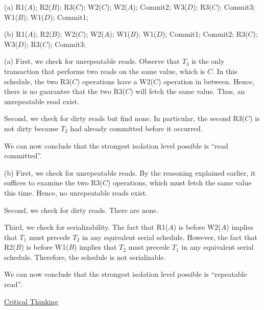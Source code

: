 \vgap

(a) R1($A$); R2($B$); R3($C$); W2($C$); W2($A$); Commit2; W3($D$); R3($C$); Commit3; W1($B$); W1($D$); Commit1;

\vgap

(b) R1($A$); R2($B$); W2($C$); W2($A$); W1($B$); W1($D$); Commit1; Commit2; R3($C$); W3($D$); R3($C$); Commit3;

\begin{sol}
     (a) First, we check for unrepeatable reads. Observe that $T_3$ is the only transaction that performs two reads on the same value, which is $C$. In this schedule, the two R3($C$) operations have a W2($C$) operation in between. Hence, there is no guarantee that the two R3($C$) will fetch the same value. Thus, an unrepeatable read exist.

    \vgap

    Second, we check for dirty reads but find none. In particular, the second R3($C$) is not dirty because $T_2$ had already committed before it occurred.

    \vgap

    We can now conclude that the strongest isolation level possible is ``read committed''.

    \vgap

   (b) First, we check for unrepeatable reads. By the reasoning explained earlier, it suffices to examine the two R3($C$) operations, which must fetch the same value this time. Hence, no unrepeatable reads exist.

   \vgap

   Second, we check for dirty reads. There are none.

   \vgap

   Third, we check for serializability. The fact that R1($A$) is before W2($A$) implies that $T_1$ must precede $T_2$ in any equivalent serial schedule. However, the fact that R2($B$) is before W1($B$) implies that $T_2$ must precede $T_1$ in any equivalent serial schedule. Therefore, the schedule is not serializable.

   \vgap

   We can now conclude that the strongest isolation level possible is ``repeatable read''.


\end{sol}


\begin{center}
    \uline{Critical Thinking}
\end{center}

